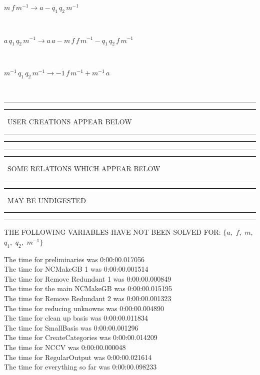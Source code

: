 \documentclass[rep10,leqno]{report}
\begin{document}
\begin{minipage}{6in}
$
m\,
 f\,
 m^{ -1 }\rightarrow a - q_{1}\,
 q_{2}\,
 m^{ -1 }
$
\end{minipage}\medskip \\
\begin{minipage}{6in}
$
a\,
 q_{1}\,
 q_{2}\,
 m^{ -1 }\rightarrow a\,
 a - m\,
 f\,
 f\,
 m^{ -1 } - q_{1}\,
 q_{2}\,
 f\,
 m^{ -1 }
$
\end{minipage}\medskip \\
\begin{minipage}{6in}
$
m^{ -1 }\,
 q_{1}\,
 q_{2}\,
 m^{ -1 }\rightarrow -1\,
 f\,
 m^{ -1 } + m^{ -1 }\,
 a
$
\end{minipage}\\
\rule[2pt]{6in}{1pt}\hfil\break
\rule[2.5pt]{1.701in}{1pt}
\ USER CREATIONS APPEAR BELOW\ 
\rule[2.5pt]{1.701in}{1pt}\hfil\break
\rule[2pt]{6in}{1pt}\hfil\break
\rule[2pt]{6in}{4pt}\hfil\break
\rule[2pt]{1.45in}{4pt}
\ SOME RELATIONS WHICH APPEAR BELOW\ 
\rule[2pt]{1.45in}{4pt}\hfil\break
\rule[2pt]{2.18in}{4pt}
\ MAY BE UNDIGESTED\ 
\rule[2pt]{2.18in}{4pt}\hfil\break
\rule[2pt]{6in}{4pt}\hfil\break
THE FOLLOWING VARIABLES HAVE NOT BEEN SOLVED FOR:\hfil\break
$\{a,
$ $
f,
$ $
m,
$ $
q_{1},
$ $
q_{2},
$ $
m^{ -1 }\}$
\smallskip\\
\vspace{10pt}

\noindent
The time for preliminaries was 0:00:00.017056\\
The time for NCMakeGB 1 was 0:00:00.001514\\
The time for Remove Redundant 1 was 0:00:00.000849\\
The time for the main NCMakeGB was 0:00:00.015195\\
The time for Remove Redundant 2 was 0:00:00.001323\\
The time for reducing unknowns was 0:00:00.004890\\
The time for clean up basis was 0:00:00.011834\\
The time for SmallBasis was 0:00:00.001296\\
The time for CreateCategories was 0:00:00.014209\\
The time for NCCV was 0:00:00.000048\\
The time for RegularOutput was 0:00:00.021614\\
The time for everything so far was 0:00:00.098233\\
\end{document}
